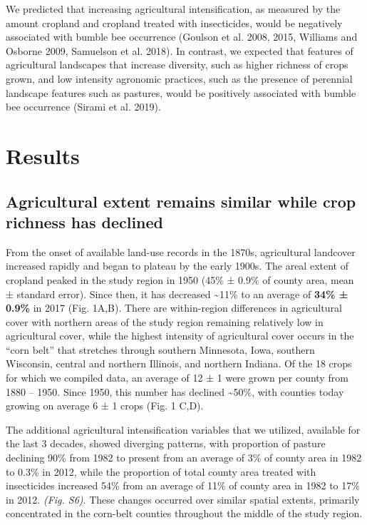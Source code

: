 \documentclass[11pt,]{article}
\begin{document}
We predicted that increasing agricultural intensification, as measured
by the amount cropland and cropland treated with insecticides, would be
negatively associated with bumble bee occurrence (Goulson et al. 2008,
2015, Williams and Osborne 2009, Samuelson et al. 2018). In contrast, we
expected that features of agricultural landscapes that increase
diversity, such as higher richness of crops grown, and low intensity
agronomic practices, such as the presence of perennial landscape
features such as pastures, would be positively associated with bumble
bee occurrence (Sirami et al. 2019).

\hypertarget{results}{%
\section{Results}\label{results}}

\hypertarget{agricultural-extent-remains-similar-while-crop-richness-has-declined}{%
\subsection{Agricultural extent remains similar while crop richness has
declined}\label{agricultural-extent-remains-similar-while-crop-richness-has-declined}}

From the onset of available land-use records in the 1870s, agricultural
landcover increased rapidly and began to plateau by the early 1900s. The
areal extent of cropland peaked in the study region in 1950 (45\% ±
0.9\% of county area, mean ± standard error). Since then, it has
decreased \textasciitilde{}11\% to an average of \textbf{34\% ± 0.9\%}
in 2017 (Fig. 1A,B). There are within-region differences in agricultural
cover with northern areas of the study region remaining relatively low
in agricultural cover, while the highest intensity of agricultural cover
occurs in the ``corn belt'' that stretches through southern Minnesota,
Iowa, southern Wisconsin, central and northern Illinois, and northern
Indiana. Of the 18 crops for which we compiled data, an average of 12 ±
1 were grown per county from 1880 -- 1950. Since 1950, this number has
declined \textasciitilde{}50\%, with counties today growing on average 6
± 1 crops (Fig. 1 C,D).

The additional agricultural intensification variables that we utilized,
available for the last 3 decades, showed diverging patterns, with
proportion of pasture declining 90\% from 1982 to present from an
average of 3\% of county area in 1982 to 0.3\% in 2012, while the
proportion of total county area treated with insecticides increased 54\%
from an average of 11\% of county area in 1982 to 17\% in 2012.
\emph{(Fig. S6)}. These changes occurred over similar spatial extents,
primarily concentrated in the corn-belt counties throughout the middle
of the study region.
\end{document}

